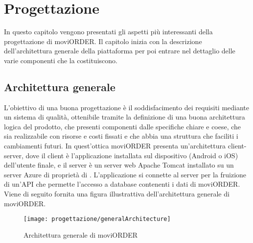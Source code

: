 
\chapter{Progettazione}
\label{cap:progettazione-codifica}

In questo capitolo vengono presentati gli aspetti più interessanti della progettazione di moviORDER. Il capitolo inizia con la descrizione dell'architettura generale della piattaforma per poi entrare nel dettaglio delle varie componenti che la costituiscono.

\section{Architettura generale}

L'obiettivo di una buona progettazione è il soddisfacimento dei requisiti mediante un sistema di qualità, ottenibile tramite la definizione di una buona architettura logica del prodotto, che presenti componenti dalle specifiche chiare e coese, che sia realizzabile con risorse e costi fissati e che abbia una struttura che faciliti i cambiamenti futuri. In quest'ottica moviORDER presenta un'architettura client-server, dove il client è l'applicazione installata sul dispositivo (Android o iOS) dell'utente finale, e il server è un server web Apache Tomcat installato su un server Azure di proprietà di \visione{}. L'applicazione si connette al server per la fruizione di un'API che permette l'accesso a database contenenti i dati di moviORDER. Viene di seguito fornita una figura illustrattiva dell'architettura generale di moviORDER.

\begin{figure}[!h] 
    \centering 
    \texttt{[image: progettazione/generalArchitecture]} 
    \caption{Architettura generale di moviORDER}
\end{figure}

